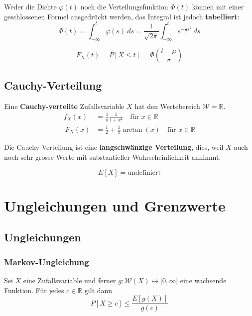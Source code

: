 \documentclass[11pt]{article}
\begin{document}
Weder die Dichte $\varphi(t)$ noch die Verteilungsfunktion $\Phi(t)$ k{\"o}nnen mit einer geschlossenen Formel ausgedr{\"u}ckt werden, das Integral ist jedoch \textbf{tabelliert}:
\begin{equation*}
	\Phi(t) = \int_{-\infty}^t \varphi(s)\ ds = \frac{1}{\sqrt{2\pi}}\int_{-\infty}^t e^{-\frac{1}{2}s^2}\ ds
\end{equation*}

\begin{equation*}
	F_X(t) = P[X \leq t] = \Phi(\frac{t-\mu}{\sigma})
\end{equation*}

\subsection{Cauchy-Verteilung}

Eine \textbf{Cauchy-verteilte} Zufallsvariable $X$ hat den Wertebereich $\mathcal{W} = \mathbb{R}$.
\begin{equation*}
\begin{split}
	f_X(x) & = \frac{1}{\pi}\frac{1}{1+x^2}\quad\text{f{\"u}r }x \in \mathbb{R} \\\
	F_X(x) & = \frac{1}{2}+\frac{1}{\pi}\arctan(x)\quad\text{f{\"u}r }x \in \mathbb{R}
\end{split}
\end{equation*}

Die Cauchy-Verteilung ist eine \textbf{langschw{\"a}nzige Verteilung}, dies, weil $X$ auch noch sehr grosse Werte mit substantieller Wahrscheinlichkeit annimmt.

\begin{equation*}
	E[X] = \text{undefiniert}
\end{equation*}

\section{Ungleichungen und Grenzwerte}

\subsection{Ungleichungen}

\subsubsection{Markov-Ungleichung}

Sei $X$ eine Zufallsvariable und ferner $g: \mathcal{W}(X) \mapsto [0, \infty[$ eine wachsende Funktion. F{\"u}r jedes $c \in \mathbb{R}$ gilt dann
\begin{equation*}
	P[X \geq c] \leq \frac{E[g(X)]}{g(c)}
\end{equation*}
\end{document}
